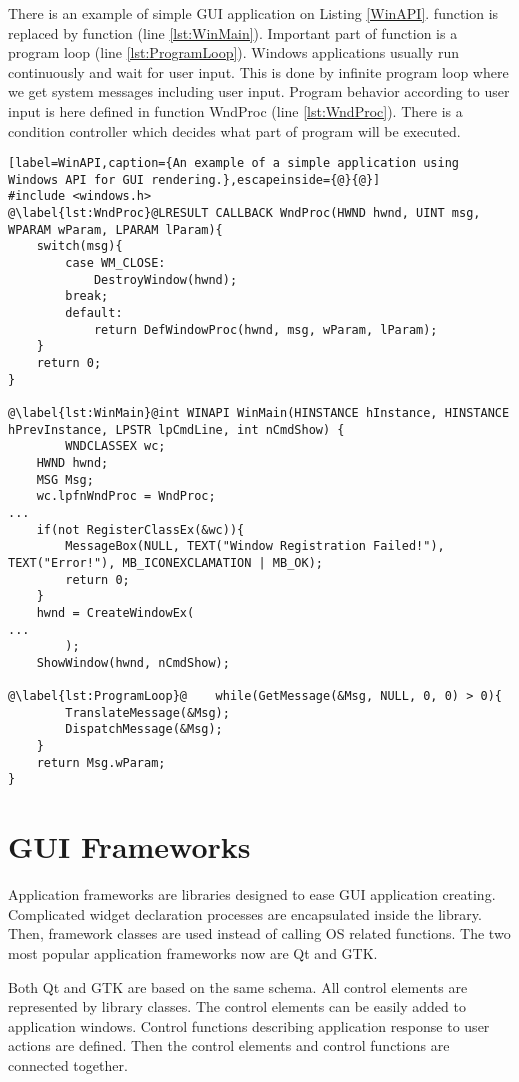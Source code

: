 There is an example of simple GUI application on Listing \ref{WinAPI}.  function is replaced by  function (line \ref{lst:WinMain}). Important part of  function is a program loop (line \ref{lst:ProgramLoop}). Windows applications usually run continuously and wait for user input. This is done by infinite program loop where we get system messages including user input. Program behavior according to user input is here defined in function WndProc (line \ref{lst:WndProc}). There is a condition controller which decides what part of program will be executed.

\begin{lstlisting}[label=WinAPI,caption={An example of a simple application using Windows API for GUI rendering.},escapeinside={@}{@}]
#include <windows.h>
@\label{lst:WndProc}@LRESULT CALLBACK WndProc(HWND hwnd, UINT msg, WPARAM wParam, LPARAM lParam){
    switch(msg){
        case WM_CLOSE:
            DestroyWindow(hwnd);
        break;
        default:
            return DefWindowProc(hwnd, msg, wParam, lParam);
    }
    return 0;
}

@\label{lst:WinMain}@int WINAPI WinMain(HINSTANCE hInstance, HINSTANCE hPrevInstance, LPSTR lpCmdLine, int nCmdShow) {
		WNDCLASSEX wc;
    HWND hwnd;
    MSG Msg;
    wc.lpfnWndProc = WndProc;    
...
    if(not RegisterClassEx(&wc)){
        MessageBox(NULL, TEXT("Window Registration Failed!"), TEXT("Error!"), MB_ICONEXCLAMATION | MB_OK);
        return 0;
    }
    hwnd = CreateWindowEx(
...
		);
    ShowWindow(hwnd, nCmdShow);

@\label{lst:ProgramLoop}@    while(GetMessage(&Msg, NULL, 0, 0) > 0){
        TranslateMessage(&Msg);
        DispatchMessage(&Msg);
    }
    return Msg.wParam;
}
\end{lstlisting}

\section{GUI Frameworks}
\label{guiframeworks}
Application frameworks are libraries designed to ease GUI application creating. Complicated widget declaration processes are encapsulated inside the library. Then, framework classes are used instead of calling OS related functions. The two most popular application frameworks now are Qt and GTK.

Both Qt and GTK are based on the same schema. All control elements are represented by library classes. The control elements can be easily added to application windows. Control functions describing application response to user actions are defined. Then the control elements and control functions are connected together.


